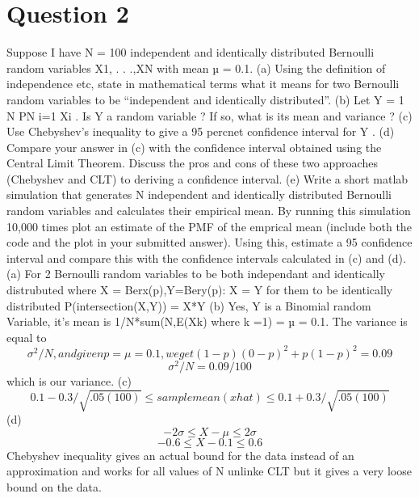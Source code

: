 \documentclass[11pt]{article} %
\begin{document}
\section{Question 2}
Suppose I have N = 100 independent and identically distributed Bernoulli random variables X1, . . .,XN with mean µ = 0.1.
\newline
(a) Using the definition of independence etc, state in mathematical terms what it means
for two Bernoulli random variables to be “independent and identically distributed”.
\newline
(b) Let Y =
1
N
PN
i=1 Xi
. Is Y a random variable ? If so, what is its mean and variance
?
\newline
(c) Use Chebyshev’s inequality to give a 95 percnet confidence interval for Y .
\newline
(d) Compare your answer in (c) with the confidence interval obtained using the Central
Limit Theorem. Discuss the pros and cons of these two approaches (Chebyshev and CLT)
to deriving a confidence interval.
\newline
(e) Write a short matlab simulation that generates N independent and identically distributed Bernoulli random variables and calculates their empirical mean. By running this
simulation 10,000 times plot an estimate of the PMF of the emprical mean (include both
the code and the plot in your submitted answer). Using this, estimate a 95 confidence
interval and compare this with the confidence intervals calculated in (c) and (d).
\newline
\newline 
(a) For 2 Bernoulli random variables to be both independant and identically distrubuted where X = Berx(p),Y=Bery(p):
X = Y for them to be identically distributed
\newline
P(intersection(X,Y)) = X*Y
\newline
(b) Yes, Y is a Binomial random Variable, it's mean is 1/N*sum(N,E(Xk) where k =1) = µ  = 0.1. 
\newline
 The variance is equal to 
\[\sigma^2/N , and  given  p = \mu = 0.1, we  get (1-p)(0-p)^2 + p(1-p)^2 = 0.09 \]
\[\sigma^2/N = 0.09/100\] which is our variance.
\newline
(c)
\[0.1 - 0.3/\sqrt{.05(100)} \leq sample mean (x hat) \leq 0.1 + 0.3/\sqrt{.05(100)}\]
\newline
(d)
\[-2\sigma \leq X - \mu \leq 2\sigma\]
\[-0.6 \leq X-0.1\leq0.6\]
Chebyshev inequality gives an actual bound for the data instead of an approximation and works for all values of N unlinke CLT but it gives a very loose bound on the data.
\end{document}

